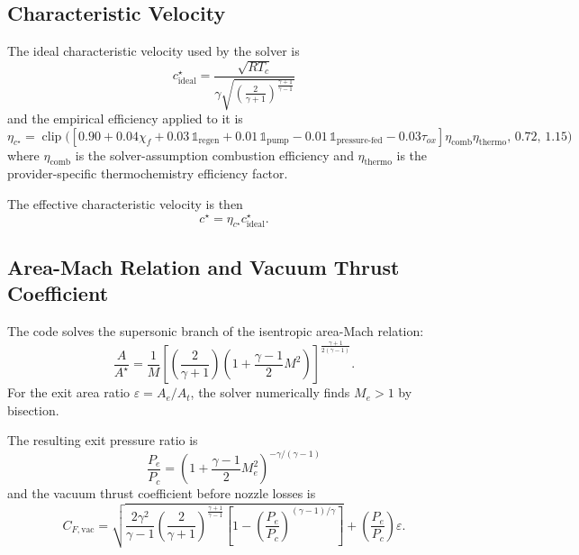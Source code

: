 \documentclass[11pt]{article}
\newcommand{\clip}{\operatorname{clip}}
\begin{document}
\subsection{Characteristic Velocity}
The ideal characteristic velocity used by the solver is
\begin{equation}
c^\star_{\text{ideal}}
=
\frac{\sqrt{RT_c}}
{
\gamma
\sqrt{
\left(\frac{2}{\gamma+1}\right)^{\frac{\gamma+1}{\gamma-1}}
}
}
\label{eq:cstar-ideal}
\end{equation}
and the empirical efficiency applied to it is
\begin{equation}
\eta_{c^\star}
=
\clip\!\Big(
\left[
0.90
+0.04\chi_f
+0.03\,\mathbb{1}_{\text{regen}}
+0.01\,\mathbb{1}_{\text{pump}}
-0.01\,\mathbb{1}_{\text{pressure-fed}}
-0.03\tau_{ox}
\right]
\eta_{\text{comb}}
\eta_{\text{thermo}},
\,
0.72,\,
1.15
\Big)
\label{eq:cstar-eff}
\end{equation}
where $\eta_{\text{comb}}$ is the solver-assumption combustion efficiency and $\eta_{\text{thermo}}$ is the provider-specific thermochemistry efficiency factor.

The effective characteristic velocity is then
\begin{equation}
c^\star=\eta_{c^\star}c^\star_{\text{ideal}}.
\label{eq:cstar}
\end{equation}

\subsection{Area-Mach Relation and Vacuum Thrust Coefficient}
The code solves the supersonic branch of the isentropic area-Mach relation:
\begin{equation}
\frac{A}{A^\star}
=
\frac{1}{M}
\left[
\left(\frac{2}{\gamma+1}\right)
\left(1+\frac{\gamma-1}{2}M^2\right)
\right]^{\frac{\gamma+1}{2(\gamma-1)}}.
\label{eq:area-mach}
\end{equation}
For the exit area ratio $\varepsilon=A_e/A_t$, the solver numerically finds $M_e>1$ by bisection.

The resulting exit pressure ratio is
\begin{equation}
\frac{P_e}{P_c}
=
\left(1+\frac{\gamma-1}{2}M_e^2\right)^{-\gamma/(\gamma-1)}
\label{eq:pressure-ratio}
\end{equation}
and the vacuum thrust coefficient before nozzle losses is
\begin{equation}
C_{F,\text{vac}}
=
\sqrt{
\frac{2\gamma^2}{\gamma-1}
\left(\frac{2}{\gamma+1}\right)^{\frac{\gamma+1}{\gamma-1}}
\left[
1-\left(\frac{P_e}{P_c}\right)^{(\gamma-1)/\gamma}
\right]
}
+
\left(\frac{P_e}{P_c}\right)\varepsilon.
\label{eq:cf-vac}
\end{equation}
\end{document}
